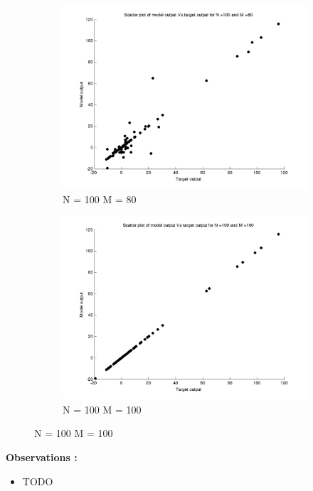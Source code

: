 \documentclass{article}
\begin{document}
\begin{figure}[H]
\begin{subfigure}{.5\textwidth}
\centering
\includegraphics[width=\linewidth]{D2/Scatter/VaryingM_N100M80}
\caption{N = 100 M = 80}
\end{subfigure}
\begin{subfigure}{.5\textwidth}
\includegraphics[width=\linewidth]{D2/Scatter/VaryingM_N100M100}
\caption{N = 100 M = 100}
\end{subfigure}


\end{figure}

\textbf{Observations : \newline}
\begin{itemize}
\item TODO
\end{itemize}
\end{document}
